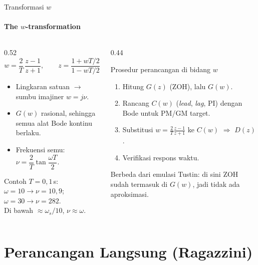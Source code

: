 \documentclass[aspectratio=169,10pt]{beamer}
\begin{document}
\begin{frame}{Transformasi $w$}
	\framesubtitle{The $w$-transformation}
	\begin{columns}[T]
		\begin{column}{0.52\textwidth}
			\small
			\[
				w = \frac{2}{T}\,\frac{z-1}{z+1},\qquad z = \frac{1 + wT/2}{1 - wT/2}
			\]
			\begin{itemize}
				\item Lingkaran satuan $\rightarrow$ sumbu imajiner $w = j\nu$.
				\item $G(w)$ rasional, sehingga semua alat Bode kontinu berlaku.
				\item Frekuensi semu: $\nu = \dfrac{2}{T}\tan\dfrac{\omega T}{2}$.
			\end{itemize}
			\scriptsize
			Contoh $T=0{,}1$\,s: $\omega=10 \rightarrow \nu = 10{,}9$; \ $\omega = 30 \rightarrow \nu = 282$.\\
			Di bawah $\approx\omega_s/10$, $\nu \approx \omega$.
		\end{column}
		\begin{column}{0.44\textwidth}
			\begin{block}{Prosedur perancangan di bidang $w$}
				\small
				\begin{enumerate}
					\item Hitung $G(z)$ (ZOH), lalu $G(w)$.
					\item Rancang $C(w)$ (\textit{lead}, \textit{lag}, PI) dengan Bode untuk PM/GM target.
					\item Substitusi $w = \frac{2}{T}\frac{z-1}{z+1}$ ke $C(w)$ $\Rightarrow$ $D(z)$.
					\item Verifikasi respons waktu.
				\end{enumerate}
			\end{block}
			{\scriptsize Berbeda dari emulasi Tustin: di sini ZOH sudah termasuk di $G(w)$, jadi tidak ada aproksimasi.}
		\end{column}
	\end{columns}
\end{frame}

\section{Perancangan Langsung (Ragazzini)\texorpdfstring{\\[4pt]{\Large{}}}{ / Direct Design (Ragazzini)}}
\end{document}
